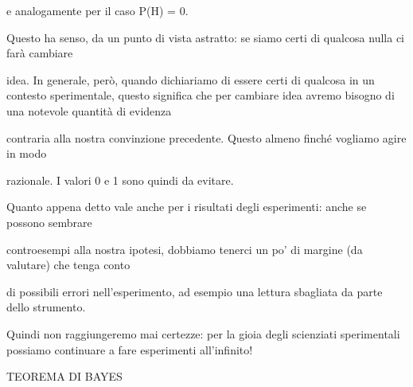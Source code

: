 \documentclass[a4paper,portrait,12pt]{article}
\begin{document}
\begin{flushleft}
e analogamente per il caso P(H) = 0.
\end{flushleft}


\begin{flushleft}
Questo ha senso, da un punto di vista astratto: se siamo certi di qualcosa nulla ci far\`{a} cambiare
\end{flushleft}


\begin{flushleft}
idea. In generale, per\`{o}, quando dichiariamo di essere certi di qualcosa in un contesto sperimentale, questo significa che per cambiare idea avremo bisogno di una notevole quantit\`{a} di evidenza
\end{flushleft}


\begin{flushleft}
contraria alla nostra convinzione precedente. Questo almeno finch\'{e} vogliamo agire in modo
\end{flushleft}


\begin{flushleft}
razionale. I valori 0 e 1 sono quindi da evitare.
\end{flushleft}


\begin{flushleft}
Quanto appena detto vale anche per i risultati degli esperimenti: anche se possono sembrare
\end{flushleft}


\begin{flushleft}
controesempi alla nostra ipotesi, dobbiamo tenerci un po' di margine (da valutare) che tenga conto
\end{flushleft}


\begin{flushleft}
di possibili errori nell'esperimento, ad esempio una lettura sbagliata da parte dello strumento.
\end{flushleft}


\begin{flushleft}
Quindi non raggiungeremo mai certezze: per la gioia degli scienziati sperimentali possiamo continuare a fare esperimenti all'infinito!
\end{flushleft}





\begin{flushleft}
 TEOREMA DI BAYES
\end{flushleft}
\end{document}
